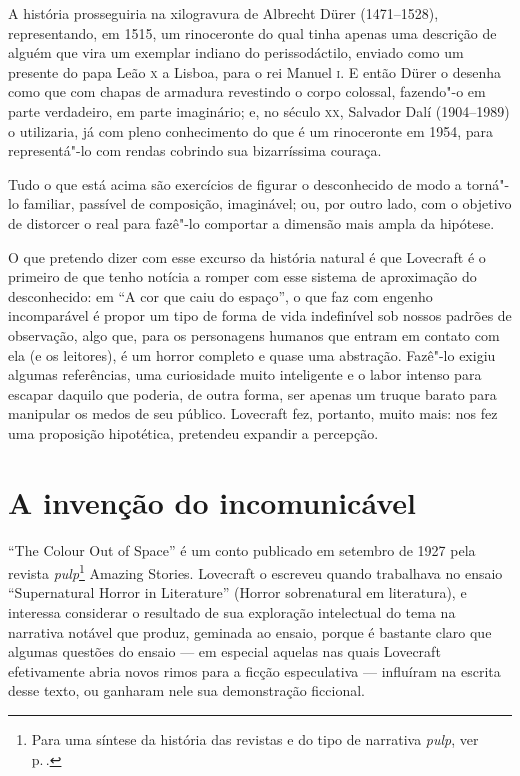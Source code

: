 A história prosseguiria na xilogravura de Albrecht Dürer (1471--1528),
representando, em 1515, um rinoceronte do qual tinha apenas uma
descrição de alguém que vira um exemplar indiano do perissodáctilo,
enviado como um presente do papa Leão \textsc{x} a Lisboa, para o rei Manuel \textsc{i}. E
então Dürer o desenha como que com chapas de armadura revestindo o corpo
colossal, fazendo"-o em parte verdadeiro, em parte imaginário; e, no
século \textsc{xx}, Salvador Dalí (1904--1989) o utilizaria, já com pleno
conhecimento do que é um rinoceronte em 1954, para representá"-lo com
rendas cobrindo sua bizarríssima couraça.

Tudo o que está acima são exercícios de figurar o desconhecido de modo a
torná"-lo familiar, passível de composição, imaginável; ou, por outro
lado, com o objetivo de distorcer o real para fazê"-lo comportar a
dimensão mais ampla da hipótese.

O que pretendo dizer com esse excurso da história natural é que
Lovecraft é o primeiro de que tenho notícia a romper com esse sistema de
aproximação do desconhecido: em ``A cor que caiu do espaço'', o que faz
com engenho incomparável é propor um tipo de forma de vida indefinível
sob nossos padrões de observação, algo que, para os personagens humanos
que entram em contato com ela (e os leitores), é um horror completo e
quase uma abstração. Fazê"-lo exigiu algumas referências, uma curiosidade
muito inteligente e o labor intenso para escapar daquilo que poderia, de
outra forma, ser apenas um truque barato para manipular os medos de seu
público. Lovecraft fez, portanto, muito mais: nos fez uma proposição
hipotética, pretendeu expandir a percepção.

\section*{A invenção do incomunicável}

``The Colour Out of Space'' é um conto publicado em setembro de 1927
pela revista \emph{pulp}\footnote{Para uma síntese da história das
  revistas e do tipo de narrativa \emph{pulp}, ver p.\,\pageref{pulp}.} Amazing Stories. Lovecraft o escreveu quando
trabalhava no ensaio ``Supernatural Horror in Literature'' (Horror
sobrenatural em literatura), e interessa considerar o resultado de sua
exploração intelectual do tema na narrativa notável que produz, geminada
ao ensaio, porque é bastante claro que algumas questões do ensaio --- em
especial aquelas nas quais Lovecraft efetivamente abria novos rimos para
a ficção especulativa --- influíram na escrita desse texto, ou ganharam
nele sua demonstração ficcional.


